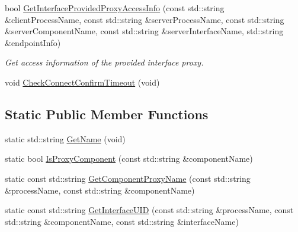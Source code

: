 \begin{DoxyCompactItemize}
\item 
bool \hyperlink{classmts_manager_global_ac56f876d73d6c494aa715d1081c9b720}{Get\+Interface\+Provided\+Proxy\+Access\+Info} (const std\+::string \&client\+Process\+Name, const std\+::string \&server\+Process\+Name, const std\+::string \&server\+Component\+Name, const std\+::string \&server\+Interface\+Name, std\+::string \&endpoint\+Info)
\begin{DoxyCompactList}\small\item\em Get access information of the provided interface proxy. \end{DoxyCompactList}\item 
void \hyperlink{classmts_manager_global_a9835ba6dae5a052c997cf5efedd10adc}{Check\+Connect\+Confirm\+Timeout} (void)
\end{DoxyCompactItemize}
\subsection*{Static Public Member Functions}
\begin{DoxyCompactItemize}
\item 
static std\+::string \hyperlink{classmts_manager_global_acd6653c4d0c6e49d7cbc890293d596e5}{Get\+Name} (void)
\item 
static bool \hyperlink{classmts_manager_global_a06739ca78771998b588fa3c3e686edff}{Is\+Proxy\+Component} (const std\+::string \&component\+Name)
\item 
static const std\+::string \hyperlink{classmts_manager_global_acfd4a5bfc428a23c5f0b1ae60bc3b39d}{Get\+Component\+Proxy\+Name} (const std\+::string \&process\+Name, const std\+::string \&component\+Name)
\item 
static const std\+::string \hyperlink{classmts_manager_global_ac5416bee759e773bb7d4bd9670db8291}{Get\+Interface\+U\+I\+D} (const std\+::string \&process\+Name, const std\+::string \&component\+Name, const std\+::string \&interface\+Name)
\end{DoxyCompactItemize}
